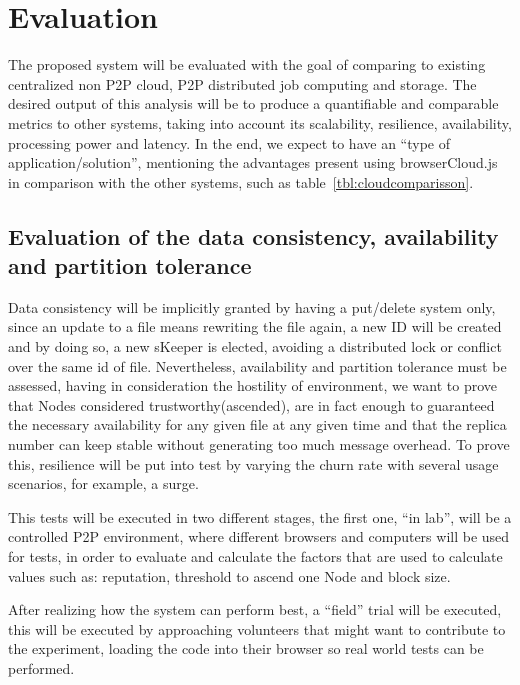 
% 
% 

\section{Evaluation}

The proposed system will be evaluated with the goal of comparing to existing centralized non P2P cloud, P2P distributed job computing and storage. The desired output of this analysis will be to produce a quantifiable and comparable metrics to other systems, taking into account its scalability, resilience, availability, processing power and latency. In the end, we expect to have an ``type of application/solution'', mentioning the advantages present using browserCloud.js in comparison with the other systems, such as table~\ref{tbl:cloudcomparisson}.


\subsection{Evaluation of the data consistency, availability and partition tolerance}

Data consistency will be implicitly granted by having a put/delete system only, since an update to a file means rewriting the file again, a new ID will be created and by doing so, a new sKeeper is elected, avoiding a distributed lock or conflict over the same id of file. Nevertheless, availability and partition tolerance must be assessed, having in consideration the hostility of environment, we want to prove that Nodes considered trustworthy(ascended), are in fact enough to guaranteed the necessary availability for any given file at any given time and that the replica number can keep stable without generating too much message overhead. To prove this, resilience will be put into test by varying the churn rate with several usage scenarios, for example, a surge.

This tests will be executed in two different stages, the first one, ``in lab'', will be a controlled P2P environment, where different browsers and computers will be used for tests, in order to evaluate and calculate the factors that are used to calculate values such as: reputation, threshold to ascend one Node and block size. 

After realizing how the system can perform best, a ``field'' trial will be executed, this will be executed by approaching volunteers that might want to contribute to the experiment, loading the code into their browser so real world tests can be performed.

